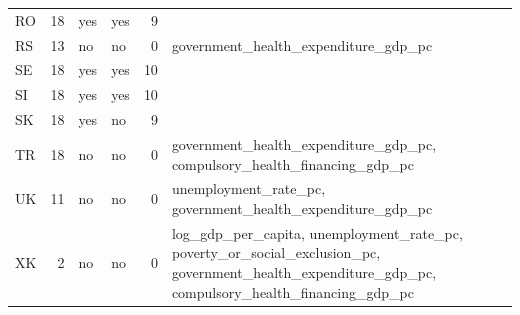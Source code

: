 \begin{table}
\begin{tabular}{lrllrl}
RO & 18 & yes & yes & 9 &  \\
RS & 13 & no & no & 0 & government\_health\_expenditure\_gdp\_pc \\
SE & 18 & yes & yes & 10 &  \\
SI & 18 & yes & yes & 10 &  \\
SK & 18 & yes & no & 9 &  \\
TR & 18 & no & no & 0 & government\_health\_expenditure\_gdp\_pc, compulsory\_health\_financing\_gdp\_pc \\
UK & 11 & no & no & 0 & unemployment\_rate\_pc, government\_health\_expenditure\_gdp\_pc \\
XK & 2 & no & no & 0 & log\_gdp\_per\_capita, unemployment\_rate\_pc, poverty\_or\_social\_exclusion\_pc, government\_health\_expenditure\_gdp\_pc, compulsory\_health\_financing\_gdp\_pc \\
\bottomrule
\end{tabular}
\end{table}
